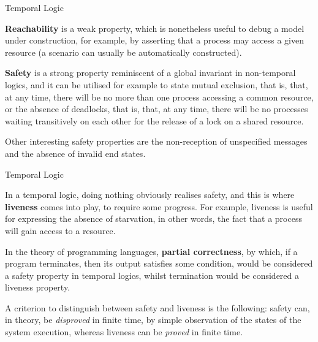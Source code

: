 \documentclass[compress,dvipdfmx]{beamer}
\begin{document}
\begin{frame}{Temporal Logic}

  \textbf{Reachability} is a weak property, which is nonetheless useful to
  debug a model under construction, for example, by asserting that a
  process may access a given resource (a scenario can usually be
  automatically constructed).

  \bigskip

  \textbf{Safety} is a strong property reminiscent of a global
  invariant in non\hyp{}temporal logics, and it can be utilised for
  example to state mutual exclusion, that is, that, at any time, there
  will be no more than one process accessing a common resource, or the
  absence of deadlocks, that is, that, at any time, there will be no
  processes waiting transitively on each other for the release of a
  lock on a shared resource.

  \bigskip

  Other interesting safety properties are the non\hyp{}reception of
  unspecified messages and the absence of invalid end states.

\end{frame}


\begin{frame}{Temporal Logic}

  In a temporal logic, doing nothing obviously realises safety, and
  this is where \textbf{liveness} comes into play, to require some
  progress. For example, liveness is useful for expressing the absence
  of starvation, in other words, the fact that a process will gain
  access to a resource.

  \bigskip

  In the theory of programming languages, \textbf{partial
    correctness}, by which, if a program terminates, then its output
  satisfies some condition, would be considered a safety property in
  temporal logics, whilst termination would be considered a liveness
  property.

  \bigskip

  A criterion to distinguish between safety and liveness is the
  following: safety can, in theory, be \emph{disproved} in finite
  time, by simple observation of the states of the system execution,
  whereas liveness can be \emph{proved} in finite time.

\end{frame}
\end{document}
